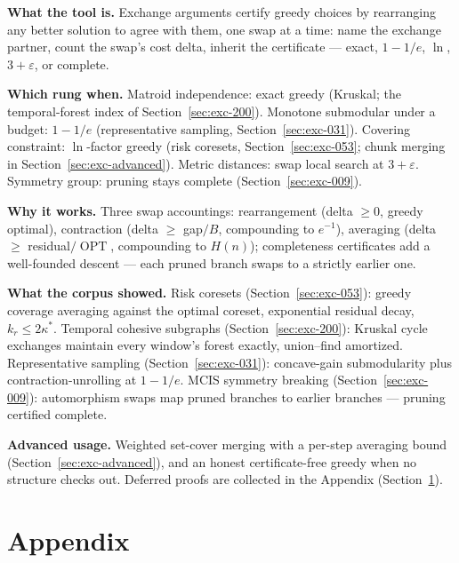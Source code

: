 \begin{recap}
\item \textbf{What the tool is.} Exchange arguments certify greedy choices by
  rearranging any better solution to agree with them, one swap at a time: name the
  exchange partner, count the swap's cost delta, inherit the certificate --- exact,
  $1-1/e$, $\ln$, $3+\varepsilon$, or complete.
\item \textbf{Which rung when.} Matroid independence: exact greedy (Kruskal; the
  temporal-forest index of Section~\ref{sec:exc-200}). Monotone submodular under a
  budget: $1-1/e$ (representative sampling, Section~\ref{sec:exc-031}). Covering
  constraint: $\ln$-factor greedy (risk coresets, Section~\ref{sec:exc-053}; chunk
  merging in Section~\ref{sec:exc-advanced}). Metric distances: swap local search at
  $3+\varepsilon$. Symmetry group: pruning stays complete
  (Section~\ref{sec:exc-009}).
\item \textbf{Why it works.} Three swap accountings: rearrangement (delta $\ge 0$,
  greedy optimal), contraction (delta $\ge$ gap$/B$, compounding to $e^{-1}$),
  averaging (delta $\ge$ residual$/\operatorname{OPT}$, compounding to $H(n)$);
  completeness certificates add a well-founded descent --- each pruned branch swaps
  to a strictly earlier one.
\item \textbf{What the corpus showed.} Risk coresets (Section~\ref{sec:exc-053}):
  greedy coverage averaging against the optimal coreset, exponential residual decay,
  $k_r\le 2\kappa^{*}$. Temporal cohesive subgraphs (Section~\ref{sec:exc-200}):
  Kruskal cycle exchanges maintain every window's forest exactly, union--find
  amortized. Representative sampling (Section~\ref{sec:exc-031}): concave-gain
  submodularity plus contraction-unrolling at $1-1/e$. MCIS symmetry breaking
  (Section~\ref{sec:exc-009}): automorphism swaps map pruned branches to earlier
  branches --- pruning certified complete.
\item \textbf{Advanced usage.} Weighted set-cover merging with a per-step averaging
  bound (Section~\ref{sec:exc-advanced}), and an honest certificate-free greedy when
  no structure checks out. Deferred proofs are collected in the Appendix
  (Section~\ref{sec:exc-appendix}).
\end{recap}

\section{Appendix}
\label{sec:exc-appendix}

